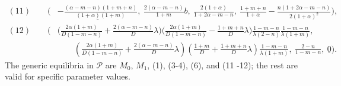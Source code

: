 \documentclass[usletter,11pt]{article}
\theoremstyle{remark}
\begin{document}
\begin{align*}
(11)\qquad  \Big(&\underline{ -\tfrac{(\alpha-m-n)(1+m+n)}{(1+\alpha)(1+m)}}, \:\tfrac{2(\alpha-m-n)}{1+m}b, \:\tfrac{2(1+\alpha)}{1+2\alpha-m-n}, \:\tfrac{1+m+n}{1+\alpha} - \tfrac{n(1+2\alpha-m-n)}{2(1+\alpha)^2}\Big),
\\[4pt]
(12)\qquad  \bigg(&\Big ( \tfrac{2\alpha(1+m)}{D(1-m-n)} + \tfrac{2(\alpha-m-n)}{D}\lambda\Big)\Big(\tfrac{2\alpha(1+m)}{D(1-m-n)} - \tfrac{1+m+n}{D}\lambda\Big)\tfrac{1-m-n}{\lambda(2-n)}\tfrac{1-m-n}{\lambda(1+m)}, \\
 &\qquad \left( \tfrac{2\alpha(1+m)}{D(1-m-n)} + \tfrac{2(\alpha-m-n)}{D}\lambda\right)\left(\tfrac{1+m}{D} + \tfrac{1+m+n}{D}\lambda\right)\tfrac{1-m-n}{\lambda(1+m)}, \ \tfrac{2-n}{1-m-n}, \ \underline{0}\bigg).
\end{align*}
The generic equilibria in $\mathcal{P}$ are $M_0$, $M_1$, (1), (3-4), (6), and (11 -12); the rest are valid for specific parameter values.
\end{document}
